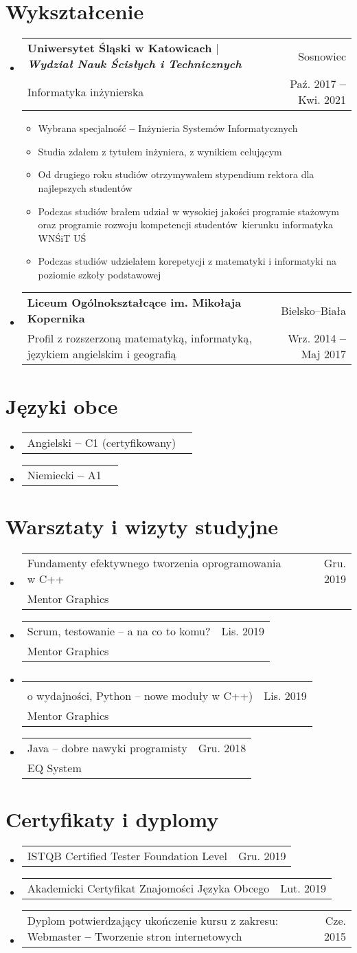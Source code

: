 \documentclass[A4,11pt]{article}
\makeatletter
\newcommand{\CVItem}[1]{\item\small{\setstretch{0.8}#1}}
\newcommand{\CVSubheading}[4]{
  \item
    \begin{tabular*}{0.97\textwidth}[t]{l@{\extracolsep{\fill}}r}
      \textbf{\setstretch{0.4}#1} & #2 \\
      \small#3 & \small #4 \\
    \end{tabular*}\vspace{3pt}
}
\newcommand{\Course}[3]{
  \item
    \begin{tabular*}{0.97\textwidth}[t]{l@{\extracolsep{\fill}}r}
      {\setstretch{0.6}#1} & #2 \\
      \footnotesize #3 \\
    \end{tabular*}\vspace{4pt}
}
\newcommand{\CVSubSubheading}[2]{
  \item
    \begin{tabular*}{0.97\textwidth}{l@{\extracolsep{\fill}}r}
      \small#1 & \small #2 \\
    \end{tabular*}\vspace{-4pt}
}
\newcommand{\CVSubHeadingListStart}{\begin{itemize}[leftmargin=0.5cm, label={}]}
\newcommand{\CVSubHeadingListEnd}{\end{itemize}}
\newcommand{\CVItemListStart}{\vspace{2pt}\begin{itemize}\vspace{-10pt}}
\newcommand{\CVItemListEnd}{\end{itemize}\vspace{-1pt}}
\makeatother
\begin{document}
\section{Wykształcenie}
  \CVSubHeadingListStart
    \CVSubheading
      {Uniwersytet Śląski w Katowicach $|$ \emph{\small{Wydział Nauk Ścisłych i Technicznych}}}{Sosnowiec}
      {Informatyka inżynierska}{Paź. 2017 \textbf{--} Kwi. 2021}
      \CVItemListStart
        \CVItem{Wybrana specjalność \textbf{--} Inżynieria Systemów Informatycznych}
        \CVItem{Studia zdałem z tytułem inżyniera, z wynikiem celującym}
        \CVItem{Od drugiego roku studiów otrzymywałem stypendium rektora dla najlepszych studentów}
        \CVItem{Podczas studiów brałem udział w wysokiej jakości programie stażowym oraz programie rozwoju kompetencji studentów~kierunku informatyka WNŚiT UŚ}
        \CVItem{Podczas studiów udzielałem korepetycji z matematyki i informatyki na poziomie szkoły podstawowej}
      \CVItemListEnd
    \CVSubheading
      {Liceum Ogólnokształcące im. Mikołaja Kopernika}{Bielsko--Biała}
      {Profil z rozszerzoną matematyką, informatyką, językiem angielskim i geografią}{Wrz. 2014 \textbf{--} Maj 2017}
  \CVSubHeadingListEnd

\section{Języki obce}
  \CVSubHeadingListStart
    \CVSubSubheading{Angielski \textbf{--} C1 (certyfikowany)}{}
    \CVSubSubheading{Niemiecki \textbf{--} A1}{}
  \CVSubHeadingListEnd

\section{Warsztaty i wizyty studyjne}
  \CVSubHeadingListStart
    \Course
      {Fundamenty efektywnego tworzenia oprogramowania w C++}{Gru. 2019}
      {Mentor Graphics}
    \Course
      {Scrum, testowanie -- a na co to komu?}{Lis. 2019}
      {Mentor Graphics}
    \Course
      {\makecell[l]{"Be quick or be dead" (Szyfrowanie stosowane, Programowanie w C++ z myślą\\o wydajności, Python -- nowe moduły w C++)}}{Lis. 2019}
      {Mentor Graphics}
    \Course
      {Java -- dobre nawyki programisty}{Gru. 2018}
      {EQ System}
  \CVSubHeadingListEnd

\section{Certyfikaty i dyplomy}
  \CVSubHeadingListStart
    \CVSubSubheading{ISTQB Certified Tester Foundation Level}{Gru. 2019}
    \CVSubSubheading{Akademicki Certyfikat Znajomości Języka Obcego}{Lut. 2019}
    \CVSubSubheading{Dyplom potwierdzający ukończenie kursu z zakresu: Webmaster \textbf{--} Tworzenie stron internetowych}{Cze. 2015}
  \CVSubHeadingListEnd
\end{document}

